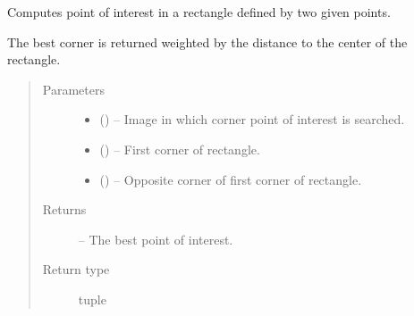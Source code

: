 \documentclass[letterpaper,10pt,english]{sphinxmanual}
\begin{document}
\begin{fulllineitems}
\label{\detokenize{image_sac:image_sac.getPointFromRectangle}}
Computes point of interest in a rectangle defined by two given points.

The best corner is returned weighted by the distance to the center of the rectangle.
\begin{quote}\begin{description}
\item[{Parameters}] \leavevmode\begin{itemize}
\item {} 
 () -- Image in which corner  point of interest is searched.

\item {} 
 () -- First corner of rectangle.

\item {} 
 () -- Opposite corner of first corner of rectangle.

\end{itemize}

\item[{Returns}] \leavevmode
{} -- The best point of interest.

\item[{Return type}] \leavevmode
tuple

\end{description}\end{quote}

\end{fulllineitems}

\end{document}
